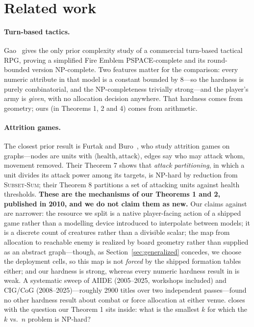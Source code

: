 \documentclass[11pt,a4paper]{article}
\theoremstyle{plain}
\theoremstyle{definition}
\theoremstyle{plain}
\theoremstyle{definition}
\theoremstyle{remark}
\newcommand{\SUBSETSUM}{\textsc{Subset-Sum}}
\begin{document}
\section{Related work}\label{sec:related}

\paragraph{Turn-based tactics.} Gao~\cite{Gao19} gives the only prior complexity study of a
commercial turn-based tactical RPG, proving a simplified Fire Emblem PSPACE-complete and its
round-bounded version NP-complete. Two features matter for the comparison: every numeric
attribute in that model is a constant bounded by 8---so the hardness is purely combinatorial,
and the NP-completeness trivially strong---and the player's army is \emph{given}, with no
allocation decision anywhere. That hardness comes from geometry; ours (in Theorems 1, 2 and 4)
comes from arithmetic.

\paragraph{Attrition games.} The closest prior result is Furtak and Buro~\cite{FB10}, who study
attrition games on graphs---nodes are units with $\langle\text{health},\text{attack}\rangle$,
edges say who may attack whom, movement removed. Their Theorem 7 shows that \emph{attack
partitioning}, in which a unit divides its attack power among its targets, is NP-hard by
reduction from \SUBSETSUM; their Theorem 8 partitions a set of attacking units against health
thresholds. \textbf{These are the mechanisms of our Theorems 1 and 2, published in 2010, and we
do not claim them as new.} Our claims against \cite{FB10} are narrower: the resource we split is
a native player-facing action of a shipped game rather than a modelling device introduced to
interpolate between models; it is a discrete count of creatures rather than a divisible scalar;
the map from allocation to reachable enemy is realized by board geometry rather than supplied as
an abstract graph---though, as Section~\ref{sec:generalized} concedes, we choose the deployment
cells, so this map is not \emph{forced} by the shipped formation tables either; and our hardness
is strong, whereas every numeric hardness result in \cite{FB10} is weak. A systematic sweep of AIIDE (2005--2025, workshops included) and CIG/CoG
(2008--2025)---roughly 2900 titles over two independent passes---found no other hardness result
about combat or force allocation at either venue. \cite{FB10} closes with the question our
Theorem 1 sits inside: what is the smallest $k$ for which the $k$ vs.\ $n$ problem is NP-hard?
\end{document}
